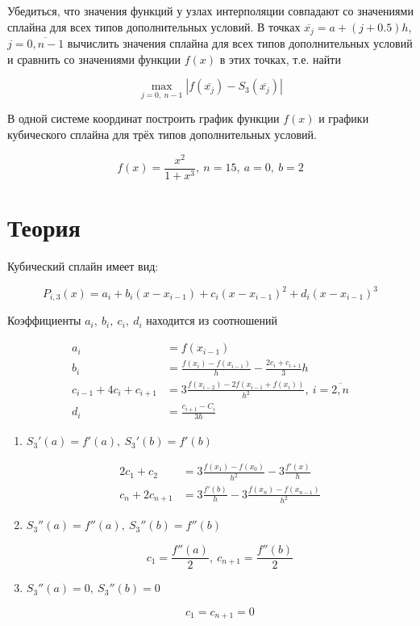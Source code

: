 \documentclass[12pt, a4paper]{article}
\begin{document}
Убедиться, что значения функций у узлах интерполяции совпадают со значениями 
сплайна для всех типов дополнительных условий. В точках
 $\overline{x_j} = a+(j+0.5)h$, $j=\overline{0, n-1}$ вычислить значения сплайна
 для всех типов дополнительных условий и сравнить со значениями функции $f(x)$ в
 этих точках, т.е. найти 
 
 \begin{equation}
	\max_{j=0,\ n-1}|f(\overline{x_j}) - S_3(\overline{x_j})|
	\label{eq:criteria}
 \end{equation}

 В одной системе координат построить график функции $f(x)$  и графики кубического 
 сплайна для трёх типов дополнительных условий.

 \begin{equation}
	 f(x) = \frac{x^2}{1+x^3},\ n=15,\ a=0,\ b=2
 \end{equation}
	
\section{Теория}

Кубический сплайн имеет вид:

\begin{equation}
	P_{i,3}(x) = a_i + b_i(x-x_{i-1}) + c_i(x-x_{i-1})^2 + d_i(x-x_{i-1})^3
\end{equation}

Коэффициенты $a_i,\ b_i,\ c_i,\ d_i$ находится из соотношений

\begin{align}
	a_i &= f(x_{i-1}) \\
	b_i &= \frac{f(x_i) - f(x_{i-1})}{h} - \frac{2c_i + c_{i+1}}{3}h \\
	c_{i-1} + 4c_i + c_{i+1} &= 3\frac{f(x_{i-2}) - 2f(x_{i-1} + f(x_i))}{h^2},\ i=\overline{2, n} \\
	d_i &= \frac{c_{i+1} - C_i}{3h}
\end{align}

\begin{enumerate}
	\item $S_3'(a) = f'(a),\ S_3'(b) = f'(b)$
	
	\begin{align}
		2c_1 + c_2 &= 3\frac{f(x_1) - f(x_0)}{h^2} - 3\frac{f'(x)}{h} \\
		c_n + 2c_{n+1} &= 3\frac{f'(b)}{h} - 3\frac{f(x_n) - f(x_{n-1})}{h^2}
	\end{align}

	\item $S_3''(a) = f''(a),\ S_3''(b)=f''(b)$
	
	\begin{equation}
		c_1 = \frac{f''(a)}{2},\ c_{n+1} = \frac{f''(b)}{2}
	\end{equation}
	
	\item $S_3''(a) = 0,\ S_3''(b) = 0$
	
	\begin{equation}
		c_1 = c_{n+1} = 0
	\end{equation}

\end{enumerate}
\end{document}
